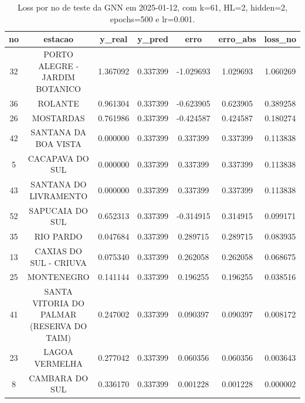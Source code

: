 \begin{table}[h]
\centering
\caption{Loss por no de teste da GNN em 2025-01-12, com k=61, HL=2, hidden=2, epochs=500 e lr=0.001.}
\label{tab:gnn_loss_k61_hl2_h2_e500_d20250112}
\begin{tabular}{ccccccc}
\toprule
no & estacao & y\_real & y\_pred & erro & erro\_abs & loss\_no \\
\midrule
32 & PORTO ALEGRE - JARDIM BOTANICO & 1.367092 & 0.337399 & -1.029693 & 1.029693 & 1.060269 \\
36 & ROLANTE & 0.961304 & 0.337399 & -0.623905 & 0.623905 & 0.389258 \\
26 & MOSTARDAS & 0.761986 & 0.337399 & -0.424587 & 0.424587 & 0.180274 \\
42 & SANTANA DA BOA VISTA & 0.000000 & 0.337399 & 0.337399 & 0.337399 & 0.113838 \\
5 & CACAPAVA DO SUL & 0.000000 & 0.337399 & 0.337399 & 0.337399 & 0.113838 \\
43 & SANTANA DO LIVRAMENTO & 0.000000 & 0.337399 & 0.337399 & 0.337399 & 0.113838 \\
52 & SAPUCAIA DO SUL & 0.652313 & 0.337399 & -0.314915 & 0.314915 & 0.099171 \\
35 & RIO PARDO & 0.047684 & 0.337399 & 0.289715 & 0.289715 & 0.083935 \\
13 & CAXIAS DO SUL - CRIUVA & 0.075340 & 0.337399 & 0.262058 & 0.262058 & 0.068675 \\
25 & MONTENEGRO & 0.141144 & 0.337399 & 0.196255 & 0.196255 & 0.038516 \\
41 & SANTA VITORIA DO PALMAR (RESERVA DO TAIM) & 0.247002 & 0.337399 & 0.090397 & 0.090397 & 0.008172 \\
23 & LAGOA VERMELHA & 0.277042 & 0.337399 & 0.060356 & 0.060356 & 0.003643 \\
8 & CAMBARA DO SUL & 0.336170 & 0.337399 & 0.001228 & 0.001228 & 0.000002 \\
\bottomrule
\end{tabular}
\end{table}

